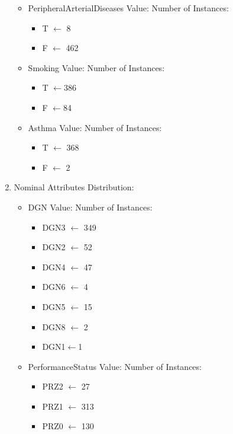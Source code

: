 \documentclass[a4paper, 11pt, oneside]{article} %
\begin{document}
\begin{enumerate}
\begin{itemize}
\begin{itemize}
\end{itemize}
\item{PeripheralArterialDiseases Value: Number of Instances:}
\begin{itemize}
\item T $\leftarrow$ 8
\item F $\leftarrow$ 462
\end{itemize}
\item{Smoking Value: Number of Instances:}
\begin{itemize}
\item T $\leftarrow$386
\item F $\leftarrow$84
\end{itemize}
\item{Asthma Value: Number of Instances:}
\begin{itemize}
\item T $\leftarrow$ 368
\item F $\leftarrow$ 2
\end{itemize}
\end{itemize}
\item {Nominal Attributes Distribution:}
\begin{itemize}
\item{DGN Value: Number of Instances:}
\begin{itemize}
\item DGN3 $\leftarrow$ 349 
\item DGN2 $\leftarrow$ 52 
\item DGN4 $\leftarrow$ 47
\item DGN6 $\leftarrow$ 4
\item DGN5 $\leftarrow$ 15
\item DGN8 $\leftarrow$ 2
\item DGN1$\leftarrow$1
\end{itemize}
\item{PerformanceStatus Value: Number of Instances:}
\begin{itemize}
\item PRZ2 $\leftarrow$ 27
\item PRZ1 $\leftarrow$ 313
\item PRZ0 $\leftarrow$ 130
\end{itemize}


\end{itemize}
\end{enumerate}
\end{document}

